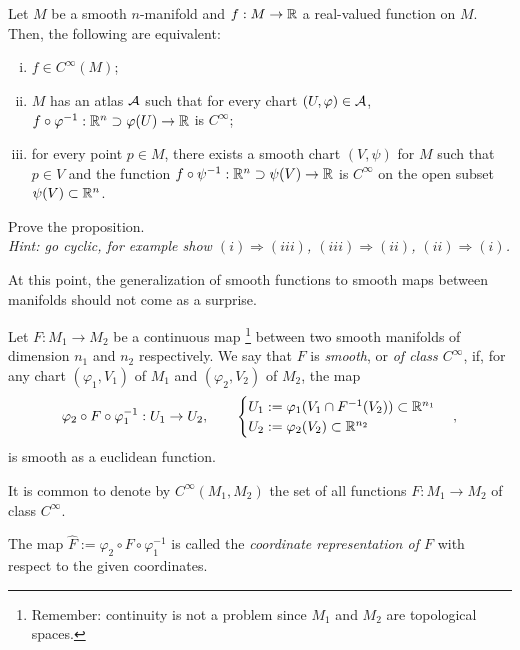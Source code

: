\begin{proposition}
  Let $M$ be a smooth $n$-manifold and $f:M\to\mathbb{R}$ a real-valued function on $M$. Then, the following are equivalent:
  \begin{enumerate}[(i)]
    \item $f\in C^\infty(M)$;
    \item $M$ has an atlas $\mathcal{A}$ such that for every chart $(U, \varphi)\in\mathcal{A}$, $f\circ \varphi^{-1} : \mathbb{R}^n\supset\varphi(U)\to \mathbb{R}$ is $C^\infty$;
    \item for every point $p\in M$, there exists a smooth chart $(V,\psi)$ for $M$ such that $p\in V$ and the function $f\circ\psi^{-1} : \mathbb{R}^n\supset\psi(V)\to \mathbb{R}$ is $C^\infty$ on the open subset $\psi(V)\subset\mathbb{R}^n$.
  \end{enumerate}
\end{proposition}

\begin{exercise}
  Prove the proposition.\\
  \textit{\small Hint: go cyclic, for example show $(i)\Rightarrow(iii)$, $(iii)\Rightarrow(ii)$, $(ii)\Rightarrow(i)$.}
\end{exercise}

At this point, the generalization of smooth functions to smooth maps between manifolds should not come as a surprise.

\begin{definition}
  Let $F:M_1\to M_2$ be a continuous map \footnote{Remember: continuity is not a problem since $M_1$ and $M_2$ are topological spaces.} between two smooth manifolds of dimension $n_1$ and $n_2$ respectively.
  We say that $F$ is \emph{smooth}, or \emph{of class $C^\infty$}, if, for any chart $(\varphi_1, V_1)$ of $M_1$ and $(\varphi_2, V_2)$ of $M_2$, the map
  \begin{align}
    \varphi_2 \circ F \circ \varphi_1^{-1}: U_1 \to U_2,\qquad
    \begin{cases}
      U_1 := \varphi_1(V_1 \cap F^{-1}(V_2))\subset\mathbb{R}^{n_1} \\
      U_2 := \varphi_2(V_2)\subset\mathbb{R}^{n_2}
    \end{cases},
  \end{align}
  is smooth as a euclidean function.

  It is common to denote by $C^\infty(M_1, M_2)$ the set of all functions $F:M_1\to M_2$ of class $C^\infty$.

  The map $\hat F := \varphi_2 \circ F \circ \varphi_1^{-1}$ is called the \emph{coordinate representation of $F$} with respect to the given coordinates.
\end{definition}


